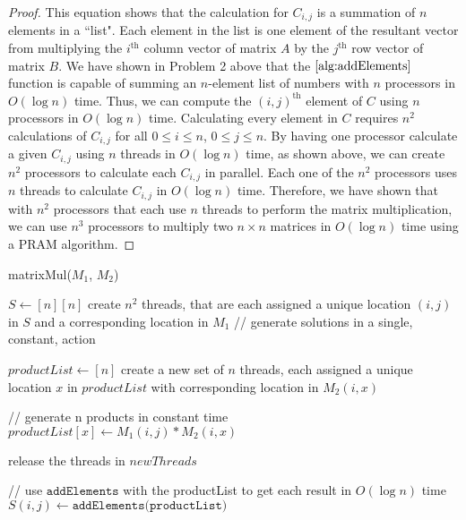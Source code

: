 \documentclass{article}
\renewcommand{\_}{\ifincsname_\else\legacyunderscore\fi}
\begin{document}
\begin{enumerate}
\begin{enumerate}
\begin{proof}
This equation shows that the calculation for $C_{i, j}$ is a summation of $n$ elements in a ``list". Each element in the list is one element of the resultant vector from multiplying the $i^{\text{th}}$ column vector of matrix $A$ by the $j^{\text{th}}$ row vector of matrix $B$. We have shown in Problem 2 above that the $\ref{alg:addElements}$ function is capable of summing an $n$-element list of numbers with $n$ processors in $O(\log n)$ time. Thus, we can compute the $(i, j)^{\text{th}}$ element of $C$ using $n$ processors in $O(\log n)$ time. Calculating every element in $C$ requires $n^2$ calculations of $C_{i, j}$ for all $0\leq i \leq n$, $0 \leq j \leq n$. By having one processor calculate a given $C_{i, j}$ using $n$ threads in $O(\log n)$ time, as shown above, we can create $n^2$ processors to calculate each $C_{i, j}$ in parallel. Each one of the $n^2$ processors uses $n$ threads to calculate $C_{i, j}$ in $O(\log n)$ time. Therefore, we have shown that with $n^2$ processors that each use $n$ threads to perform the matrix multiplication, we can use $n^3$ processors to multiply two $n\times n$ matrices in $O(\log n)$ time using a PRAM algorithm. \end{proof}
	
	
        \begin{function}
            \DontPrintSemicolon
            \caption{matrixMul($M_1$, $M_2$)}
            \label{alg:matrixMul}
            $S \gets [n][n]$\;
            create $n^2$ threads, that are each assigned a unique location $(i, j)$ in $S$ and a corresponding location in $M_1$\;
            \;
            // generate solutions in a single, constant, action\;
            {
                $productList \gets [n]$\;
                create a new set of $n$ threads, each assigned a unique location $x$ in $productList$ with corresponding location in $M_2(i, x)$\;\;

                // generate n products in constant time\;
                {
                    $productList[x] \gets M_1(i,j) * M_2(i, x)$\;
                }\;

                release the threads in $newThreads$\;\;

                // use $\texttt{addElements}$ with the productList to get each result in $O(\log n)$ time\;
                $S(i, j) \gets \texttt{addElements(productList)}$\;\;
            
            }
            
        \end{function}
    
    \end{enumerate}

\end{enumerate}
\end{document}
